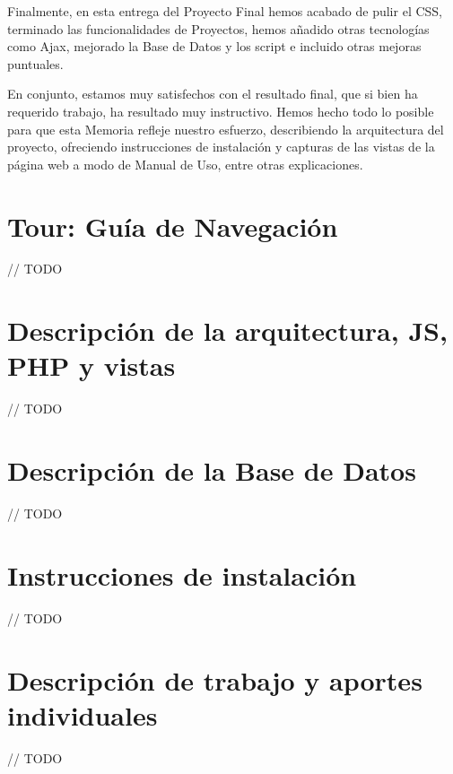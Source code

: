\documentclass[12pt]{report}
\begin{document}
Finalmente, en esta entrega del Proyecto Final hemos acabado de pulir el CSS, terminado las funcionalidades de Proyectos, hemos añadido otras tecnologías como Ajax, mejorado la Base de Datos y los script e incluido otras mejoras puntuales.

En conjunto, estamos muy satisfechos con el resultado final, que si bien ha requerido trabajo, ha resultado muy instructivo. Hemos hecho todo lo posible para que esta Memoria refleje nuestro esfuerzo, describiendo la arquitectura del proyecto, ofreciendo instrucciones de instalación y capturas de las vistas de la página web a modo de Manual de Uso, entre otras explicaciones. 

\section{Tour: Guía de Navegación}

// TODO

\section{Descripción de la arquitectura, JS, PHP y vistas}

// TODO

\section{Descripción de la Base de Datos}

// TODO

\section{Instrucciones de instalación}

// TODO

\section{Descripción de trabajo y aportes individuales}

// TODO
\end{document}
